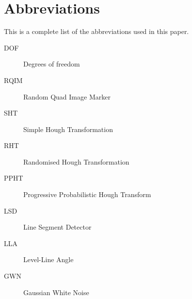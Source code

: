 \chapter*{Abbreviations}
This is a complete list of the abbreviations used in this paper.

\begin{description}
	\item[DOF] Degrees of freedom
	\item[RQIM] Random Quad Image Marker
	\item[SHT] Simple Hough Transformation
	\item[RHT] Randomised Hough Transformation
	\item[PPHT] Progressive Probabilistic Hough Transform
	\item[LSD] Line Segment Detector
	\item[LLA] Level-Line Angle
	\item[GWN] Gaussian White Noise
\end{description}